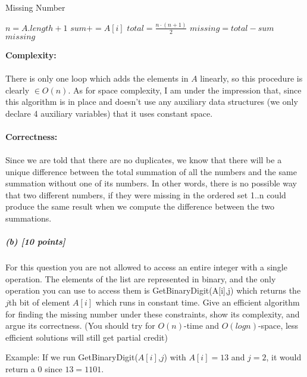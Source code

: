 \documentclass[11pt]{article}
\begin{document}
\begin{algorithm}
\caption{Missing Number}\label{euclid}
\begin{algorithmic}[1]
\State $n = A.length+1$
\State $sum += A[i]$
\EndFor
\State $total = \frac{n \cdot (n+1)}{2}$
\State $missing = total - sum$\\
\Return $missing$
\EndProcedure
\end{algorithmic}
\end{algorithm}
\noindent\textbf{Complexity:}\\\\ There is only one loop which adds the elements in $A$ linearly, so this procedure is clearly $\in O(n)$. As for space complexity, I am under the impression that, since this algorithm is in place and doesn't use any auxiliary data structures (we only declare 4 auxiliary variables) that it uses constant space. \\\\
\noindent\textbf{Correctness:}\\\\ Since we are told that there are no duplicates, we know that there will be a unique difference between the total summation of all the numbers and the same summation without one of its numbers. In other words, there is no possible way that two different numbers, if they were missing in the ordered set 1..n could produce the same result when we compute the difference between the two summations. 

\subparagraph{(b) [10 points]}
For this question you are not allowed to access an entire integer with a single operation. The elements of the list are represented in binary, and the only operation you can use to access them is {GetBinaryDigit(A[i],j)} which returns the $j$th bit of element $A[i]$ which runs in constant time. Give an efficient algorithm for finding the missing number under these constraints, show its complexity, and argue its correctness.
(You should try for $O(n)$-time and $O(log n)$-space, less efficient solutions will still get partial credit)

Example: If we run GetBinaryDigit($A[i]$,$j$) with $A[i]=13$ and $j=2$, it would return a $0$ since $13=1101$.\\
\end{document}
